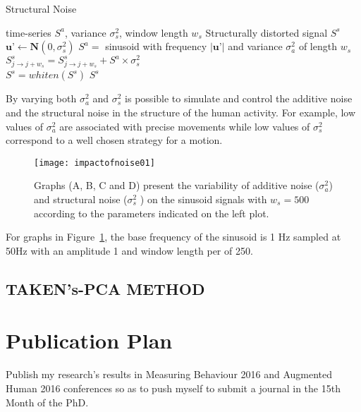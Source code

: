 \documentclass[10pt,journal,compsoc]{IEEEtran}
\begin{document}
\begin{algorithm}[H]
\caption{Structural Noise}
\begin{algorithmic}[1]
 \renewcommand{\algorithmicrequire}{\textbf{Input:}}
 \renewcommand{\algorithmicensure}{\textbf{Output:}}
 \REQUIRE time-series $S^a$, variance $\sigma_s ^2$, window length $w_s$
 \ENSURE  Structurally distorted signal $S^s$
  \STATE $\textbf{u'} \leftarrow \textbf{N}(0, \sigma_s ^2)$
  \STATE $S^{a} =$ sinusoid with frequency $| \textbf{u'} |$ and variance $\sigma_a ^2$ of length $w_s$
  \STATE $S^s_{j \rightarrow j+w_s}  = S^s_{j \rightarrow j+w_s}  + S^{a} \times   \sigma_s ^2 $
  \ENDFOR
  \\ $S^s= whiten (S^s)$
 \RETURN $S^s$
\end{algorithmic}
\end{algorithm}

By varying both $\sigma_a ^2$ and $\sigma_s ^2$ 
is possible to simulate and control the additive noise and the structural noise 
in the structure of the human activity. For example, low values of $\sigma_a ^2$ 
are associated with precise movements while low values of $\sigma_s ^2$ correspond 
to a well chosen strategy for a motion.


\begin{figure}[!htb]
\centering    
 \texttt{[image: impactofnoise01]}
\caption[PA]{Graphs (A, B, C and D) present the variability of additive noise 
($\sigma_a ^2$) and structural noise ($\sigma_s ^2$ ) on the sinusoid signals with $w_s=500$ 
according to the parameters indicated on the left plot.}
\label{fig:sn}
\end{figure}

For graphs in Figure~\ref{fig:sn}, the base frequency of the sinusoid is 1 Hz sampled at 50Hz with an 
amplitude 1 and window length per of 250.





\subsection{TAKEN's-PCA METHOD}

\section{Publication Plan}

Publish my research's results in Measuring Behaviour 2016
and Augmented Human 2016 conferences so as to push myself 
to submit a journal in the 15th Month of the PhD.
\end{document}
